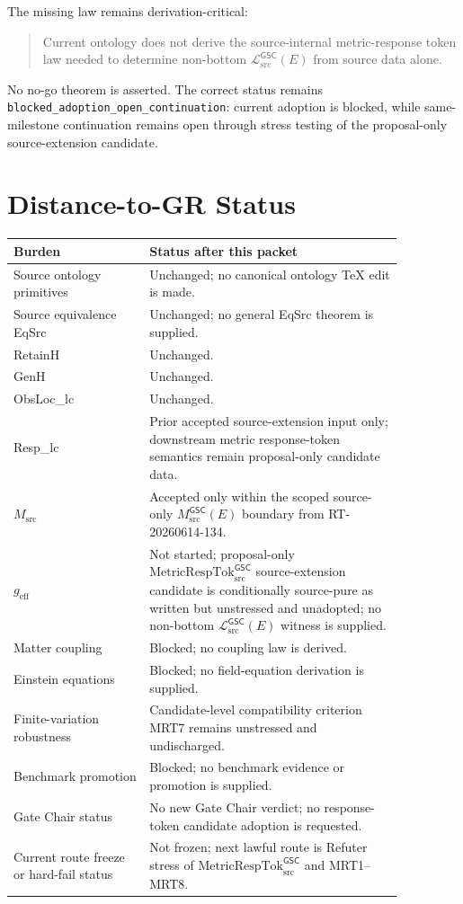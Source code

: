 \documentclass[11pt]{article}
\newcommand{\Msrc}{M_{\mathrm{src}}}
\newcommand{\MsrcGSC}{M_{\mathrm{src}}^{\mathsf{GSC}}}
\newcommand{\MetricRespTok}{\mathrm{MetricRespTok}_{\mathrm{src}}^{\mathsf{GSC}}}
\newcommand{\MetricData}{\mathcal{L}_{\mathrm{src}}^{\mathsf{GSC}}}
\newcommand{\geff}{g_{\mathrm{eff}}}
\begin{document}
The missing law remains derivation-critical:

\begin{quote}
Current ontology does not derive the source-internal metric-response token law
needed to determine non-bottom \(\MetricData(E)\) from source data alone.
\end{quote}

No no-go theorem is asserted. The correct status remains
\texttt{blocked\_adoption\_open\_continuation}: current adoption is blocked,
while same-milestone continuation remains open through stress testing of the
proposal-only source-extension candidate.

\section{Distance-to-GR Status}

\begin{longtable}{p{0.30\linewidth}p{0.56\linewidth}}
\toprule
Burden & Status after this packet \\
\midrule
Source ontology primitives & Unchanged; no canonical ontology TeX edit is made. \\
Source equivalence EqSrc & Unchanged; no general EqSrc theorem is supplied. \\
RetainH & Unchanged. \\
GenH & Unchanged. \\
ObsLoc\_lc & Unchanged. \\
Resp\_lc & Prior accepted source-extension input only; downstream metric response-token semantics remain proposal-only candidate data. \\
\(\Msrc\) & Accepted only within the scoped source-only \(\MsrcGSC(E)\) boundary from RT-20260614-134. \\
\(\geff\) & Not started; proposal-only \(\MetricRespTok\) source-extension candidate is conditionally source-pure as written but unstressed and unadopted; no non-bottom \(\MetricData(E)\) witness is supplied. \\
Matter coupling & Blocked; no coupling law is derived. \\
Einstein equations & Blocked; no field-equation derivation is supplied. \\
Finite-variation robustness & Candidate-level compatibility criterion MRT7 remains unstressed and undischarged. \\
Benchmark promotion & Blocked; no benchmark evidence or promotion is supplied. \\
Gate Chair status & No new Gate Chair verdict; no response-token candidate adoption is requested. \\
Current route freeze or hard-fail status & Not frozen; next lawful route is Refuter stress of \(\MetricRespTok\) and MRT1--MRT8. \\
\bottomrule
\end{longtable}
\end{document}
